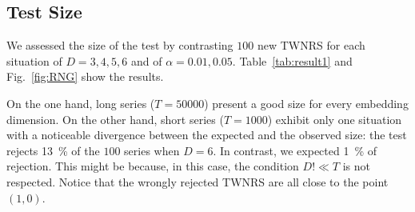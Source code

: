 \subsection{Test Size}

We assessed the size of the test by contrasting $100$ new TWNRS for each situation of $D=3,4,5,6$ and of $\alpha=0.01,0.05$.
Table~\ref{tab:result1} and Fig.~\ref{fig:RNG} 
show the results.

On the one hand, long series ($T=50000$) present a good size for every embedding dimension.
On the other hand, short series ($T=1000$) exhibit only one situation with a noticeable divergence between the expected and the observed size: the test rejects \SI{13}{\percent} of the $100$ series when $D=6$. 
In contrast, we expected \SI{1}{\percent} of rejection.
This might be because, in this case, the condition $D!\ll T$ is not respected.
Notice that the wrongly rejected TWNRS are all close to the point $(1,0)$.

%
%
%

